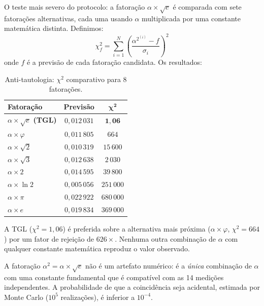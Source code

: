 \documentclass[12pt,a4paper,twoside]{article}
\newcommand{\alphaii}{\alpha^{2}}
\begin{document}
O teste mais severo do protocolo: a fatoração $\alpha \times \sqrt{e}$ é comparada com sete fatorações alternativas, cada uma usando $\alpha$ multiplicada por uma constante matemática distinta. Definimos:
%
\begin{equation}
\chi^2_f = \sum_{i=1}^{N} \left(\frac{\alphaii^{(i)} - f}{\sigma_i}\right)^{\!2}
\end{equation}
%
onde $f$ é a previsão de cada fatoração candidata. Os resultados:

\begin{table}[H]
\centering
\caption{Anti-tautologia: $\chi^2$ comparativo para 8 fatorações.}
\label{tab:anti_tautologia}
\begin{tabular}{lcc}
\toprule
\textbf{Fatoração} & \textbf{Previsão} & $\boldsymbol{\chi^2}$ \\
\midrule
$\alpha \times \sqrt{e}$ \textbf{(TGL)} & $0{,}012\,031$ & $\boldsymbol{1{,}06}$ \\
\midrule
$\alpha \times \varphi$ & $0{,}011\,805$ & $664$ \\
$\alpha \times \sqrt{2}$ & $0{,}010\,319$ & $15\,600$ \\
$\alpha \times \sqrt{3}$ & $0{,}012\,638$ & $2\,030$ \\
$\alpha \times 2$ & $0{,}014\,595$ & $39\,800$ \\
$\alpha \times \ln 2$ & $0{,}005\,056$ & $251\,000$ \\
$\alpha \times \pi$ & $0{,}022\,922$ & $680\,000$ \\
$\alpha \times e$ & $0{,}019\,834$ & $369\,000$ \\
\bottomrule
\end{tabular}
\end{table}

\noindent A TGL ($\chi^2 = 1{,}06$) é preferida sobre a alternativa mais próxima ($\alpha \times \varphi$, $\chi^2 = 664$) por um fator de rejeição de $626\times$. Nenhuma outra combinação de $\alpha$ com qualquer constante matemática reproduz o valor observado.

\begin{resultbox}[title={Anti-tautologia}]
A fatoração $\alphaii = \alpha \times \sqrt{e}$ não é um artefato numérico: é a \textit{única} combinação de $\alpha$ com uma constante fundamental que é compatível com as 14 medições independentes. A probabilidade de que a coincidência seja acidental, estimada por Monte Carlo ($10^5$ realizações), é inferior a $10^{-4}$.
\end{resultbox}
\end{document}
